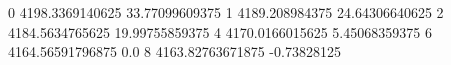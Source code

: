0 4198.3369140625 33.77099609375
1 4189.208984375 24.64306640625
2 4184.5634765625 19.99755859375
4 4170.0166015625 5.45068359375
6 4164.56591796875 0.0
8 4163.82763671875 -0.73828125
